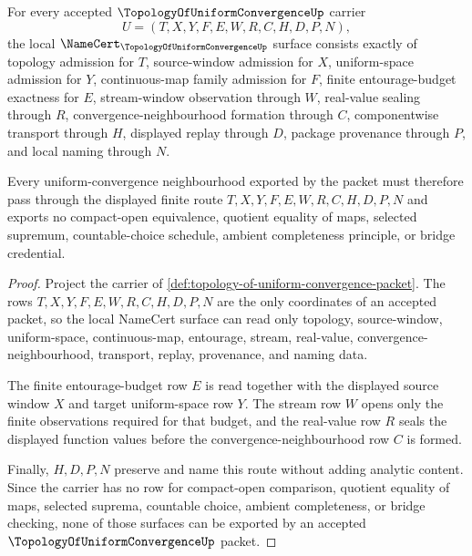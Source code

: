 \begin{theorem}
\label{thm:topology-of-uniform-convergence-obligation-surface}
For every accepted $\TopologyOfUniformConvergenceUp$ carrier
$$
U=(T,X,Y,F,E,W,R,C,H,D,P,N),
$$
the local $\NameCert_{\TopologyOfUniformConvergenceUp}$ surface consists exactly of topology admission for $T$, source-window admission for $X$, uniform-space admission for $Y$, continuous-map family admission for $F$, finite entourage-budget exactness for $E$, stream-window observation through $W$, real-value sealing through $R$, convergence-neighbourhood formation through $C$, componentwise transport through $H$, displayed replay through $D$, package provenance through $P$, and local naming through $N$.

Every uniform-convergence neighbourhood exported by the packet must therefore pass through the displayed finite route $T,X,Y,F,E,W,R,C,H,D,P,N$ and exports no compact-open equivalence, quotient equality of maps, selected supremum, countable-choice schedule, ambient completeness principle, or bridge credential.
\end{theorem}
\begin{proof}
Project the carrier of \autoref{def:topology-of-uniform-convergence-packet}. The rows $T,X,Y,F,E,W,R,C,H,D,P,N$ are the only coordinates of an accepted packet, so the local NameCert surface can read only topology, source-window, uniform-space, continuous-map, entourage, stream, real-value, convergence-neighbourhood, transport, replay, provenance, and naming data.

The finite entourage-budget row $E$ is read together with the displayed source window $X$ and target uniform-space row $Y$. The stream row $W$ opens only the finite observations required for that budget, and the real-value row $R$ seals the displayed function values before the convergence-neighbourhood row $C$ is formed.

Finally, $H,D,P,N$ preserve and name this route without adding analytic content. Since the carrier has no row for compact-open comparison, quotient equality of maps, selected suprema, countable choice, ambient completeness, or bridge checking, none of those surfaces can be exported by an accepted $\TopologyOfUniformConvergenceUp$ packet.
\end{proof}


